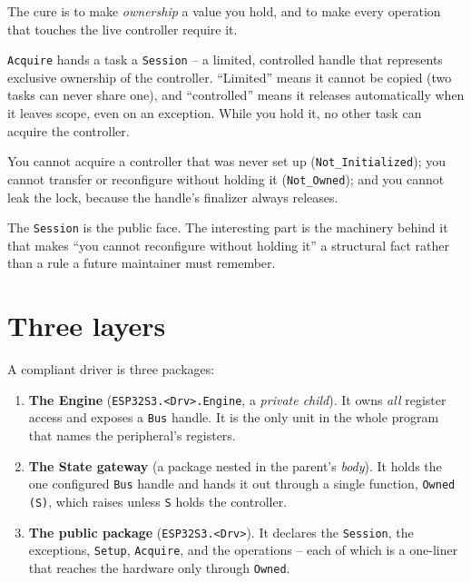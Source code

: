 The cure is to make \emph{ownership} a value you hold, and to make every operation
that touches the live controller require it.

\begin{description}[style=nextline]
\item[A \texttt{Session} is a capability.] \texttt{Acquire} hands a task a
  \texttt{Session} -- a limited, controlled handle that represents exclusive
  ownership of the controller. ``Limited'' means it cannot be copied (two tasks
  can never share one), and ``controlled'' means it releases automatically when it
  leaves scope, even on an exception. While you hold it, no other task can
  acquire the controller.
\item[Three things become impossible.] You cannot acquire a controller that was
  never set up (\texttt{Not\_Initialized}); you cannot transfer or reconfigure
  without holding it (\texttt{Not\_Owned}); and you cannot leak the lock, because
  the handle's finalizer always releases.
\end{description}

The \texttt{Session} is the public face. The interesting part is the machinery
behind it that makes ``you cannot reconfigure without holding it'' a structural
fact rather than a rule a future maintainer must remember.

\section{Three layers}

A compliant driver is three packages:

\begin{enumerate}
\item \textbf{The Engine} (\texttt{ESP32S3.<Drv>.Engine}, a \emph{private child}).
  It owns \emph{all} register access and exposes a \texttt{Bus} handle. It is the
  only unit in the whole program that names the peripheral's registers.
\item \textbf{The State gateway} (a package nested in the parent's \emph{body}). It
  holds the one configured \texttt{Bus} handle and hands it out through a single
  function, \texttt{Owned (S)}, which raises unless \texttt{S} holds the
  controller.
\item \textbf{The public package} (\texttt{ESP32S3.<Drv>}). It declares the
  \texttt{Session}, the exceptions, \texttt{Setup}, \texttt{Acquire}, and the
  operations -- each of which is a one-liner that reaches the hardware only
  through \texttt{Owned}.
\end{enumerate}

